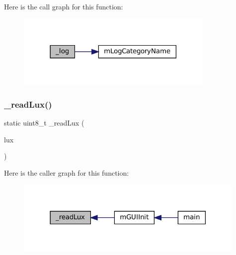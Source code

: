 Here is the call graph for this function\+:
\nopagebreak
\begin{figure}[H]
\begin{center}
\leavevmode
\includegraphics[width=270pt]{gui-runner_8c_abd0ecb64e5e72d771823f2e8aa966fc6_cgraph}
\end{center}
\end{figure}
\mbox{\label{gui-runner_8c_af64856302df899dfbfabdc3d70ab87bf}} 
\subsubsection{\texorpdfstring{\+\_\+read\+Lux()}{\_readLux()}}
{\footnotesize\ttfamily static uint8\+\_\+t \+\_\+read\+Lux (\begin{DoxyParamCaption}\item[{struct G\+B\+A\+Luminance\+Source $\ast$}]{lux }\end{DoxyParamCaption})\hspace{0.3cm}{\ttfamily [static]}}

Here is the caller graph for this function\+:
\nopagebreak
\begin{figure}[H]
\begin{center}
\leavevmode
\includegraphics[width=314pt]{gui-runner_8c_af64856302df899dfbfabdc3d70ab87bf_icgraph}
\end{center}
\end{figure}
\mbox{\label{gui-runner_8c_a9a5743d49a1e798b2bd55145d96b438d}} 
